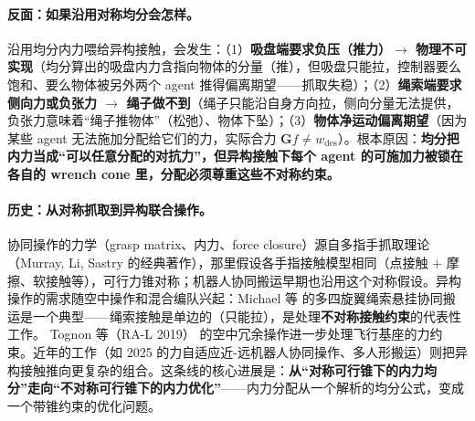 \paragraph{反面：如果沿用对称均分会怎样。}
沿用均分内力喂给异构接触，会发生：（1）\textbf{吸盘端要求负压（推力）$\to$ 物理不可实现}（均分算出的吸盘内力含指向物体的分量（推），但吸盘只能拉，控制器要么饱和、要么物体被另外两个 agent 推得偏离期望——抓取失稳）；（2）\textbf{绳索端要求侧向力或负张力 $\to$ 绳子做不到}（绳子只能沿自身方向拉，侧向分量无法提供，负张力意味着“绳子推物体”（松弛）、物体下坠）；（3）\textbf{物体净运动偏离期望}（因为某些 agent 无法施加分配给它们的力，实际合力 $\mathbf{G}f\ne w_{\mathrm{des}}$）。根本原因：\textbf{均分把内力当成“可以任意分配的对抗力”，但异构接触下每个 agent 的可施加力被锁在各自的 wrench cone 里，分配必须尊重这些不对称约束。}

\paragraph{历史：从对称抓取到异构联合操作。}
协同操作的力学（grasp matrix、内力、force closure）源自多指手抓取理论（Murray, Li, Sastry 的经典著作），那里假设各手指接触模型相同（点接触 $+$ 摩擦、软接触等），可行力锥对称；机器人协同搬运早期也沿用这个对称假设。异构操作的需求随空中操作和混合编队兴起：Michael 等\cite{michael2014aerial} 的多四旋翼绳索悬挂协同搬运是一个典型——绳索接触是单边的（只能拉），是处理\textbf{不对称接触约束}的代表性工作。%
Tognon 等（RA-L 2019）\cite{tognon2019aerial} 的空中冗余操作进一步处理飞行基座的力约束。近年的工作（如 2025 的力自适应近-远机器人协同操作、多人形搬运）则把异构接触推向更复杂的组合。这条线的核心进展是：\textbf{从“对称可行锥下的内力均分”走向“不对称可行锥下的内力优化”}——内力分配从一个解析的均分公式，变成一个带锥约束的优化问题。

